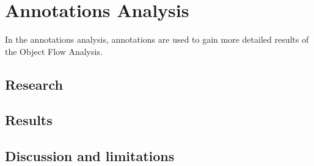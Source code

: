\documentclass[main.tex]{subfiles}
\begin{document}
    \chapter{Annotations Analysis}\label{chap:annotations_analysis}
        In the annotations analysis, annotations are used to gain more detailed results of the Object Flow Analysis.
    
    \section{Research}\label{sec:aa_research}

    \section{Results}\label{sec:aa_results}

    \section{Discussion and limitations}\label{sec:aa_discussion}
        
\end{document}
